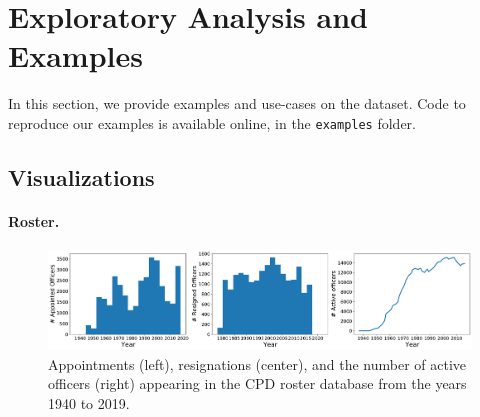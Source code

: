 
\section{Exploratory Analysis and Examples} \label{sec:analysis}

In this section, we provide examples and use-cases on the dataset. Code to
reproduce our examples is available online, in the \texttt{examples} folder.

\subsection{Visualizations}

\paragraph{Roster.}


\begin{figure}[t!] 
\includegraphics[width=\textwidth]{figs/history} 
\caption{Appointments (left), resignations (center), and the number of active
officers (right) appearing in the CPD roster database from the years 1940 to 2019.}
\label{fig:history}
\end{figure}

